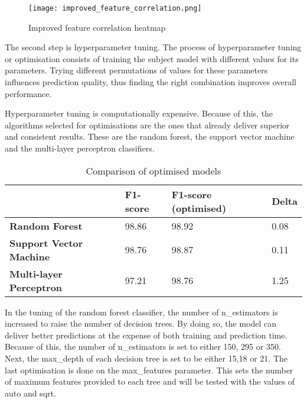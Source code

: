 \begin{figure}[!b]
	\centering
	\texttt{[image: improved\_feature\_correlation.png]}
	\caption{Improved feature correlation heatmap}
	\label{fig:IMPROVED_FEATURE_CORRELATION}
\end{figure}

The second step is hyperparameter tuning. The process of hyperparameter tuning or optimisation consists of training the subject model with different values for its parameters. Trying different permutations of values for these parameters influences prediction quality, thus finding the right combination improves overall performance.

Hyperparameter tuning is computationally expensive. Because of this, the algorithms selected for optimisations are the ones that already deliver superior and consistent results. These are the random forest, the support vector machine and the multi-layer perceptron classifiers.

\begin{singlespace}
	\begin{table}
		\begin{center}
			\begin{tabular}{  m{13em}  m{5em}  m{10em}  m{2.3em} }\toprule

				                                & \textbf{F1-score} & \textbf{F1-score (optimised)} & \textbf{Delta} \\ \midrule

				\textbf{Random Forest}          & 98.86             & 98.92                         & 0.08           \\

				\textbf{Support Vector Machine} & 98.76             & 98.87                         & 0.11           \\

				\textbf{Multi-layer Perceptron} & 97.21             & 98.76                         & 1.25           \\ \bottomrule
			\end{tabular}
			\captionsetup{type=table}\caption{Comparison of optimised models}
			\label{tab:OPTIMISED_MODELS}
		\end{center}
	\end{table}
\end{singlespace}

In the tuning of the random forest classifier, the number of n\_estimators is increased to raise the number of decision trees. By doing so, the model can deliver better predictions at the expense of both training and prediction time. Because of this, the number of n\_estimators is set to either 150, 295 or 350. Next, the max\_depth of each decision tree is set to be either 15,18 or 21. The last optimisation is done on the max\_features parameter. This sets the number of maximum features provided to each tree and will be tested with the values of auto and sqrt.

